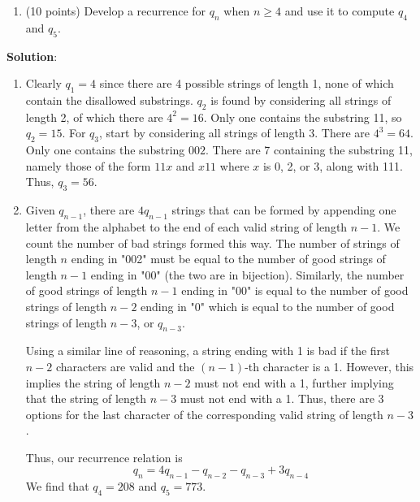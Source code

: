 \documentclass[12pt]{article}
\newenvironment{solution}{
\begin{mdframed}
  { {\bfseries Solution}: }}{
\end{mdframed}}
\begin{document}
\begin{enumerate}
\begin{enumerate}[label=({\alph*})]
      \item (10 points) Develop a recurrence for \(q_{n}\) when \(n \geq 4\) and use it to compute \(q_{4}\) and \(q_{5}\).
    \end{enumerate}

    \begin{solution}
      \begin{enumerate}[label=({\alph*})]
        \item Clearly \(q_{1} = 4\) since there are 4 possible strings of length 1, none of which contain the disallowed substrings.
        \(q_{2}\) is found by considering all strings of length 2, of which there are \(4^{2} = 16\). Only one contains the substring 11, so \(q_{2} = 15\).
        For \(q_{3}\), start by considering all strings of length 3. There are \(4^{3} = 64\). Only one contains the substring \(002\). There are 7 containing the substring 11, namely those of the form \(11x\) and \(x11\) where \(x\) is 0, 2, or 3, along with 111. Thus, \(q_{3} = 56\).

        \item Given \(q_{n-1}\), there are \(4 q_{n-1}\) strings that can be formed by appending one letter from the alphabet to the end of each valid string of length \(n-1\).
        We count the number of bad strings formed this way. The number of strings  of length \(n\) ending in "002" must be equal to the number of good strings of length \(n - 1\) ending in "00" (the two are in bijection).
        Similarly, the number of good strings of length \(n - 1\) ending in "00" is equal to the number of good strings of length \(n - 2\) ending in "0" which is equal to the number of good strings of length \(n - 3\), or \(q_{n - 3}\).

        Using a similar line of reasoning, a string ending with 1 is bad if the first \(n - 2\) characters are valid and the \((n - 1)\)-th character is a 1.
        However, this implies the string of length \(n - 2\) must not end with a 1, further implying that the string of length \(n - 3\) must not end with a 1.
        Thus, there are 3 options for the last character of the corresponding valid string of length \(n - 3\).

        Thus, our recurrence relation is
        \begin{equation*}
          q_{n} = 4 q_{n - 1} - q_{n - 2} - q_{n - 3} + 3 q_{n - 4}
        \end{equation*}
        We find that \(q_{4} = 208\) and \(q_{5} = 773\).
      \end{enumerate}
    \end{solution}


\end{enumerate}
\end{document}
